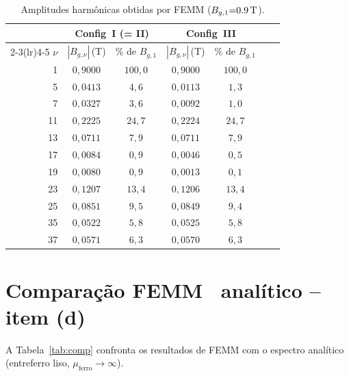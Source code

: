 \documentclass[12pt,a4paper]{article}
\begin{document}
\begin{table}[h!]
\centering\small
\caption{Amplitudes harmônicas obtidas por FEMM ($B_{g,1}{=}\SI{0{,}9}{T}$).}
\label{tab:femm}
\setlength{\tabcolsep}{5pt}
\begin{tabular}{rcccccc}
\toprule
     & \multicolumn{2}{c}{Config~I (= II)} & \multicolumn{2}{c}{Config~III}\\
\cmidrule(lr){2-3}\cmidrule(lr){4-5}
$\nu$ & $|B_{g,\nu}|$\,(T) & \% de $B_{g,1}$
      & $|B_{g,\nu}|$\,(T) & \% de $B_{g,1}$\\
\midrule
 1 & $0{,}9000$ & $100{,}0$ & $0{,}9000$ & $100{,}0$\\
 5 & $0{,}0413$ & $4{,}6$   & $0{,}0113$ & $1{,}3$\\
 7 & $0{,}0327$ & $3{,}6$   & $0{,}0092$ & $1{,}0$\\
11 & $0{,}2225$ & $24{,}7$  & $0{,}2224$ & $24{,}7$\\
13 & $0{,}0711$ & $7{,}9$   & $0{,}0711$ & $7{,}9$\\
17 & $0{,}0084$ & $0{,}9$   & $0{,}0046$ & $0{,}5$\\
19 & $0{,}0080$ & $0{,}9$   & $0{,}0013$ & $0{,}1$\\
23 & $0{,}1207$ & $13{,}4$  & $0{,}1206$ & $13{,}4$\\
25 & $0{,}0851$ & $9{,}5$   & $0{,}0849$ & $9{,}4$\\
35 & $0{,}0522$ & $5{,}8$   & $0{,}0525$ & $5{,}8$\\
37 & $0{,}0571$ & $6{,}3$   & $0{,}0570$ & $6{,}3$\\
\bottomrule
\end{tabular}
\end{table}

\section{Comparação FEMM \texttimes\ analítico -- item (d)}

A Tabela~\ref{tab:comp} confronta os resultados de FEMM com o espectro
analítico (entreferro liso, $\mu_\text{ferro}{\to}\infty$).
\end{document}
